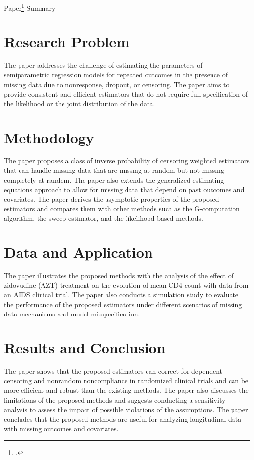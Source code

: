 \documentclass[UTF8,a4paper,10pt]{article}
\begin{document}
\pagebreak

Paper\Footcite{Robins1995} Summary



\section*{Research Problem}
The paper addresses the challenge of estimating the parameters of semiparametric regression models for repeated outcomes in the presence of missing data due to nonresponse, dropout, or censoring. The paper aims to provide consistent and efficient estimators that do not require full specification of the likelihood or the joint distribution of the data.

\section*{Methodology}
The paper proposes a class of inverse probability of censoring weighted estimators that can handle missing data that are missing at random but not missing completely at random. The paper also extends the generalized estimating equations approach to allow for missing data that depend on past outcomes and covariates. The paper derives the asymptotic properties of the proposed estimators and compares them with other methods such as the G-computation algorithm, the sweep estimator, and the likelihood-based methods.

\section*{Data and Application}
The paper illustrates the proposed methods with the analysis of the effect of zidovudine (AZT) treatment on the evolution of mean CD4 count with data from an AIDS clinical trial. The paper also conducts a simulation study to evaluate the performance of the proposed estimators under different scenarios of missing data mechanisms and model misspecification.

\section*{Results and Conclusion}
The paper shows that the proposed estimators can correct for dependent censoring and nonrandom noncompliance in randomized clinical trials and can be more efficient and robust than the existing methods. The paper also discusses the limitations of the proposed methods and suggests conducting a sensitivity analysis to assess the impact of possible violations of the assumptions. The paper concludes that the proposed methods are useful for analyzing longitudinal data with missing outcomes and covariates.
\end{document}
